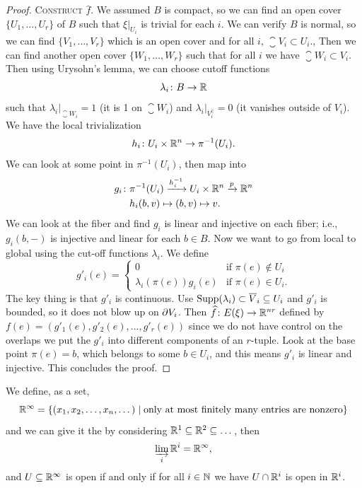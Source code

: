 \begin{proof}
\textsc{Construct $\widehat{f}$.} We assumed $B$ is compact, so we can
find an open cover $\{U_{1},\dots,U_{r}\}$ of $B$ such that
$\xi|_{U_{i}}$ is trivial for each $i$. We can verify $B$ is normal,
so we can find $\{V_{1},\dots,V_{r}\}$ which is an open cover and for
all $i$, $\closure{V}_{i}\subset U_{i}$., Then we can find another
open cover $\{W_{1},\dots,W_{r}\}$ such that for all $i$ we have
$\closure{W}_{i}\subset V_{i}$. Then using Urysohn's lemma,
we can choose cutoff functions
\begin{equation}
\lambda_{i}\colon B\to\mathbb{R}
\end{equation}
such that $\lambda_{i}|_{\closure{W}_{i}}=1$ (it is 1 on $\closure{W}_{i}$) and $\lambda_{i}|_{V_{i}^{\complement}}=0$
(it vanishes outside of $V_{i}$). We have the local trivialization
\begin{equation}
h_{i}\colon U_{i}\times\mathbb{R}^{n}\to\pi^{-1}(U_{i}).
\end{equation}
We can look at some point in $\pi^{-1}(U_{i})$, then map into
\begin{align}
g_{i}\colon & \pi^{-1}(U_{i})\xrightarrow{h_{i}^{-1}}U_{i}\times\mathbb{R}^{n}\xrightarrow{p}\mathbb{R}^{n}\\
& h_{i}(b,v)\mapsto (b,v)\mapsto v.\nonumber
\end{align}
We can look at the fiber and find $g_{i}$ is linear and injective on
each fiber; i.e., $g_{i}(b,-)$ is injective and linear for each $b\in B$.
Now we want to go from local to global using the cut-off functions $\lambda_{i}$.
We define
\begin{equation}
g'_{i}(e)=\begin{cases}0 & \mbox{if }\pi(e)\notin U_{i}\\
\lambda_{i}(\pi(e))g_{i}(e) & \mbox{if }\pi(e)\in U_{i}.
\end{cases}
\end{equation}
The key thing is that $g'_{i}$ is continuous. Use
$\Support(\lambda_{i})\propersubset\closure{V}_{i}\subset U_{i}$ and
$g'_{i}$ is bounded, so it does not blow up on $\partial V_{i}$.
Then $\widehat{f}\colon E(\xi)\to\mathbb{R}^{nr}$ defined by
$f(e)=(g'_{1}(e), g'_{2}(e),\dots, g'_{r}(e))$ since we do not have
control on the overlaps we put the $g'_{i}$ into different components
of an $r$-tuple. Look at the base point $\pi(e)=b$, which belongs to
some $b\in U_{i}$, and this means $g'_{i}$ is linear and
injective. This concludes the proof.
\end{proof}

\begin{definition}
We define, as a set,
\begin{equation*}
\mathbb{R}^{\infty}=\{(x_{1},x_{2},\dots,x_{n},\dots)\mid\mbox{only at most finitely many entries are nonzero}\}
\end{equation*}
and we can give it the  by considering
$\mathbb{R}^{1}\subseteq\mathbb{R}^{2}\subseteq\dots$, then
\begin{equation*}
\varinjlim_{i}\mathbb{R}^{i}=\mathbb{R}^{\infty},
\end{equation*}
and $U\subseteq\mathbb{R}^{\infty}$ is open if and only if for all $i\in\mathbb{N}$ we
have $U\cap\mathbb{R}^{i}$ is open in $\mathbb{R}^{i}$.
\end{definition}

